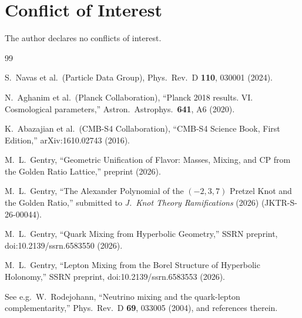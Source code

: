 \documentclass[12pt]{article}
\theoremstyle{definition}
\begin{document}
\section*{Conflict of Interest}
The author declares no conflicts of interest.

\begin{thebibliography}{99}

  S.~Navas et al.\ (Particle Data Group),
  Phys.\ Rev.\ D \textbf{110}, 030001 (2024).

  N.~Aghanim et al.\ (Planck Collaboration),
  ``Planck 2018 results. VI. Cosmological parameters,''
  Astron.\ Astrophys.\ \textbf{641}, A6 (2020).

  K.~Abazajian et al.\ (CMB-S4 Collaboration),
  ``CMB-S4 Science Book, First Edition,''
  arXiv:1610.02743 (2016).

  M.~L.~Gentry,
  ``Geometric Unification of Flavor: Masses, Mixing, and CP
  from the Golden Ratio Lattice,''
  preprint (2026).

  M.~L.~Gentry,
  ``The Alexander Polynomial of the $(-2,3,7)$ Pretzel Knot
  and the Golden Ratio,''
  submitted to \textit{J.\ Knot Theory Ramifications} (2026)
  (JKTR-S-26-00044).

  M.~L.~Gentry,
  ``Quark Mixing from Hyperbolic Geometry,''
  SSRN preprint, doi:10.2139/ssrn.6583550 (2026).

  M.~L.~Gentry,
  ``Lepton Mixing from the Borel Structure of Hyperbolic Holonomy,''
  SSRN preprint, doi:10.2139/ssrn.6583553 (2026).

  See e.g.\ W.~Rodejohann,
  ``Neutrino mixing and the quark-lepton complementarity,''
  Phys.\ Rev.\ D \textbf{69}, 033005 (2004), and references therein.

\end{thebibliography}
\end{document}
